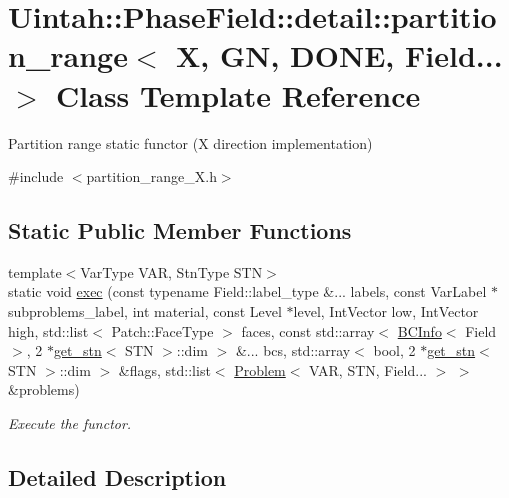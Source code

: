 \hypertarget{classUintah_1_1PhaseField_1_1detail_1_1partition__range_3_01X_00_01GN_00_01DONE_00_01Field_8_8_8_01_4}{}\section{Uintah\+:\+:Phase\+Field\+:\+:detail\+:\+:partition\+\_\+range$<$ X, GN, D\+O\+NE, Field... $>$ Class Template Reference}
\label{classUintah_1_1PhaseField_1_1detail_1_1partition__range_3_01X_00_01GN_00_01DONE_00_01Field_8_8_8_01_4}


Partition range static functor (X direction implementation)  




{\ttfamily \#include $<$partition\+\_\+range\+\_\+\+X.\+h$>$}

\subsection*{Static Public Member Functions}
\begin{DoxyCompactItemize}
\item 
{\footnotesize template$<$Var\+Type V\+AR, Stn\+Type S\+TN$>$ }\\static void \hyperlink{classUintah_1_1PhaseField_1_1detail_1_1partition__range_3_01X_00_01GN_00_01DONE_00_01Field_8_8_8_01_4_aa1e61750c34c2eb589915e421320130b}{exec} (const typename Field\+::label\+\_\+type \&... labels, const Var\+Label $\ast$subproblems\+\_\+label, int material, const Level $\ast$level, Int\+Vector low, Int\+Vector high, std\+::list$<$ Patch\+::\+Face\+Type $>$ faces, const std\+::array$<$ \hyperlink{structUintah_1_1PhaseField_1_1BCInfo}{B\+C\+Info}$<$ Field $>$, 2 $\ast$\hyperlink{structUintah_1_1PhaseField_1_1get__stn}{get\+\_\+stn}$<$ S\+TN $>$\+::dim $>$ \&... bcs, std\+::array$<$ bool, 2 $\ast$\hyperlink{structUintah_1_1PhaseField_1_1get__stn}{get\+\_\+stn}$<$ S\+TN $>$\+::dim $>$ \&flags, std\+::list$<$ \hyperlink{classUintah_1_1PhaseField_1_1Problem}{Problem}$<$ V\+AR, S\+TN, Field... $>$ $>$ \&problems)
\begin{DoxyCompactList}\small\item\em Execute the functor. \end{DoxyCompactList}\end{DoxyCompactItemize}


\subsection{Detailed Description}
